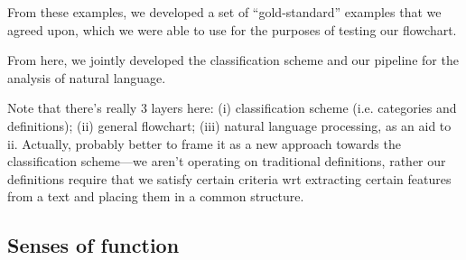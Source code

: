 \documentclass{article}
\begin{document}
From these examples, we developed a set of ``gold-standard'' examples that we agreed upon, which we were able to use for the purposes of testing our flowchart.

From here, we jointly developed the classification scheme and our pipeline for the analysis of natural language.

Note that there's really 3 layers here: (i) classification scheme (i.e. categories and definitions); (ii) general flowchart; (iii) natural language processing, as an aid to ii.
Actually, probably better to frame it as a new approach towards the classification scheme---we aren't operating on traditional definitions, rather our definitions require that we satisfy certain criteria wrt extracting certain features from a text and placing them in a common structure.

\subsection{Senses of function}
\label{sec:senses-function}
\end{document}
